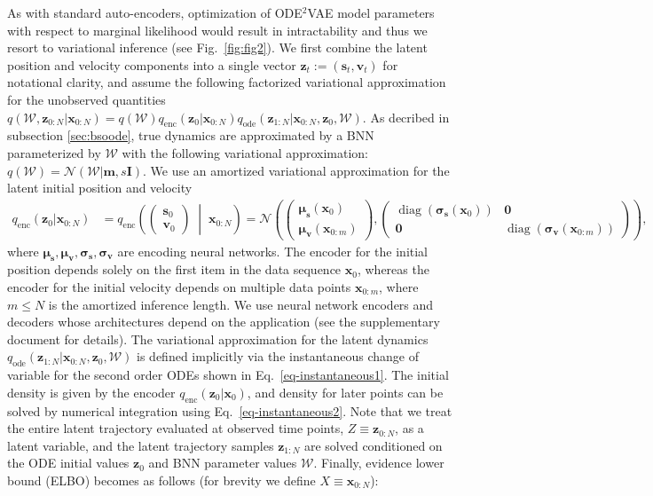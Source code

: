 \documentclass{article}
\newcommand{\x}{\mathbf{x}}
\newcommand{\z}{\mathbf{z}}
\renewcommand{\v}{\mathbf{v}}
\newcommand{\m}{{\mathbf{m}}}
\newcommand{\0}{\mathbf{0}}
\newcommand{\N}{\mathcal{N}}
\newcommand{\s}{\mathbf{s}}
\newcommand{\bs}{{\boldsymbol{\sigma}}}
\newcommand{\bmu}{{\boldsymbol{\mu}}}
\DeclareMathOperator{\diag}{diag}
\begin{document}
As with standard auto-encoders, optimization of ODE$^2$VAE model parameters with respect to marginal likelihood would result in intractability and thus we resort to variational inference (see Fig.~\ref{fig:fig2}). We first combine the latent position and velocity components into a single vector $\z_t:= (\s_t,\v_t)$ for notational clarity, and assume the following factorized variational approximation for the unobserved quantities $q(\mathcal{W},\z_{0:N}|\x_{0:N}) = q(\mathcal{W})q_\text{enc}(\z_0|\x_{0:N})q_\text{ode}(\z_{1:N}|\x_{0:N},\z_0,\mathcal{W})$. As decribed in subsection \ref{sec:bsoode}, true dynamics are approximated by a BNN parameterized by $\mathcal{W}$ with the following variational approximation: $q(\mathcal{W}) = \N(\mathcal{W} | \m,s\mathbf{I})$. We use an amortized variational approximation for the latent initial position and velocity
\begin{align}
q_\text{enc}(\z_0 | \x_{0:N}) &= q_\text{enc}\left(\begin{pmatrix} \s_0 \\ \v_0 \end{pmatrix} \; \middle| \; \x_{0:N} \right) = \N \left( \begin{pmatrix} \bmu_\s(\x_{0}) \\ \bmu_\v(\x_{0:m}) \end{pmatrix}, \begin{pmatrix} \diag(\bs_\s(\x_{0})) & \0 \\ \0 & \diag(\bs_\v(\x_{0:m})) \end{pmatrix} \right) , \label{eg:qenc}
\end{align}
where $\bmu_\s,\bmu_\v,\bs_\s,\bs_\v$ are encoding neural networks. The encoder for the initial position depends solely on the first item in the data sequence $\x_0$, whereas the encoder for the initial velocity depends on multiple data points $\x_{0:m}$, where $m \le N$ is the amortized inference length. We use neural network encoders and decoders whose architectures depend on the application (see the supplementary document for details). The variational approximation for the latent dynamics $q_\text{ode}(\z_{1:N}|\x_{0:N},\z_0,\mathcal{W})$ is defined implicitly via the instantaneous change of variable for the second order ODEs shown in Eq.~\ref{eq-instantaneous1}. The initial density is given by the encoder $q_\text{enc}(\z_0 | \x_0)$, and density for later points can be solved by numerical integration using Eq.~\ref{eq-instantaneous2}. Note that we treat the entire latent trajectory evaluated at observed time points, $Z \equiv \z_{0:N}$, as a latent variable, and the latent trajectory samples $\z_{1:N}$ are solved conditioned on the ODE initial values $\z_0$ and BNN parameter values $\mathcal{W}$.  Finally, evidence lower bound (ELBO) becomes as follows (for brevity we define $X \equiv \x_{0:N}$):
\end{document}
